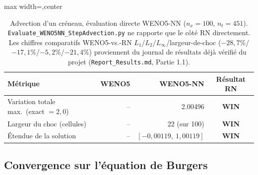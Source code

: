 \documentclass[11pt]{article}
\newcommand{\WIN}{%
    \cellcolor{winbg}\textcolor{wintext}{\textbf{WIN}}%
}
\newcommand{\rowrule}{\specialrule{0.30pt}{0pt}{0pt}}
\begin{document}
\begin{table}[htbp]

\begin{adjustbox}{max width=\textwidth,center}

\begin{tabular}{lrrc}

\toprule

\textbf{Métrique}
&
\textbf{WENO5}
&
\textbf{WENO5-NN}
&
\textbf{Résultat RN}
\\

\midrule

Variation totale max.\ (exact $=2{,}0$)
&
--
&
\num{2.00496}
&
\WIN
\\

\rowrule

Largeur du choc (cellules)
&
--
&
22 (sur 100)
&
\WIN
\\

\rowrule

Étendue de la solution
&
--
&
$[-0{,}00119,\ 1{,}00119]$
&
\WIN
\\

\bottomrule

\end{tabular}

\end{adjustbox}

\caption{
Advection d'un créneau, évaluation directe WENO5-NN
($n_x=100$, $n_t=451$).
\texttt{Evaluate\_WENO5NN\_StepAdvection.py}
ne rapporte que le côté RN directement.
Les chiffres comparatifs WENO5-vs.-RN
$L_1$/$L_2$/$L_\infty$/largeur-de-choc
($-28,7\%$/$-17,1\%$/$-5,2\%$/$-21,4\%$)
proviennent du journal de résultats déjà vérifié du projet
(\texttt{Report\_Results.md}, Partie 1.1).
}

\end{table}


\subsection{Convergence sur l'équation de Burgers}
\end{document}
